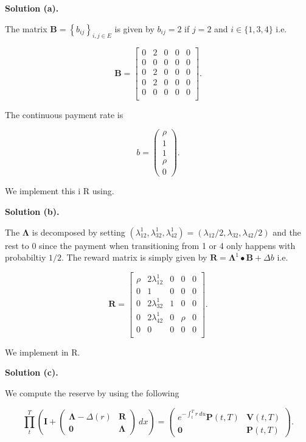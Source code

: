 \documentclass[
]{book}
\begin{document}
\textbf{Solution (a).}

The matrix \(\mathbf B=\left\{b_{ij}\right\}_{i,j\in E}\) is given by \(b_{ij}=2\) if \(j=2\) and \(i\in \{1,3,4\}\) i.e.

\[
\mathbf B=
\begin{bmatrix}
0 & 2 &0 &0 & 0 \\
0 & 0 &0 &0 & 0 \\
0 & 2 &0 &0 & 0 \\
0 & 2 &0 &0 & 0 \\
0 & 0 &0 &0 & 0 \\
\end{bmatrix}.
\]

The continuous payment rate is

\[
b=\begin{pmatrix}
\rho\\
1\\
1\\
\rho\\
0
\end{pmatrix}.
\]

We implement this i R using.

\textbf{Solution (b).}

The \(\mathbf \Lambda\) is decomposed by setting \((\lambda^1_{12},\lambda^1_{32},\lambda^1_{42})=(\lambda_{12}/2,\lambda_{32},\lambda_{42}/2)\) and the rest to 0 since the payment when transitioning from 1 or 4 only happens with probabiltiy \(1/2\). The reward matrix is simply given by \(\mathbf R=\mathbf \Lambda^1 \bullet \mathbf B + \Delta b\) i.e.

\[
\mathbf R = 
\begin{bmatrix}
\rho & 2\lambda_{12}^1 &0 &0 & 0 \\
0 & 1 &0 &0 & 0 \\
0 & 2\lambda_{32}^1 &1 &0 & 0 \\
0 & 2\lambda_{42}^1 &0 &\rho & 0 \\
0 & 0 &0 &0 & 0 \\
\end{bmatrix}.
\]

We implement in R.

\textbf{Solution (c).}

We compute the reserve by using the following

\[
\prod_t^T\left(\mathbf I+\begin{pmatrix}
\mathbf \Lambda-\Delta(r) & \mathbf R\\
\mathbf 0 & \mathbf \Lambda
\end{pmatrix}\ dx\right)=
\begin{pmatrix}
e^{-\int_t^Tr\ du}\mathbf P(t,T) & \mathbf V(t,T)\\
\mathbf 0 & \mathbf P(t,T)
\end{pmatrix}.
\]
\end{document}
